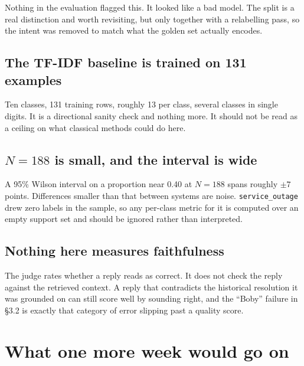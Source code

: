 \documentclass[11pt,a4paper]{article}
\begin{document}
Nothing in the evaluation flagged this. It looked like a bad model. The split is a real
distinction and worth revisiting, but only together with a relabelling pass, so the intent
was removed to match what the golden set actually encodes.

\subsection{The TF-IDF baseline is trained on 131 examples}

Ten classes, 131 training rows, roughly 13 per class, several classes in single digits.
It is a directional sanity check and nothing more. It should not be read as a ceiling on
what classical methods could do here.

\subsection{$N=188$ is small, and the interval is wide}

A 95\% Wilson interval on a proportion near 0.40 at $N=188$ spans roughly $\pm 7$ points.
Differences smaller than that between systems are noise. \texttt{service\_outage} drew
zero labels in the sample, so any per-class metric for it is computed over an empty
support set and should be ignored rather than interpreted.

\subsection{Nothing here measures faithfulness}

The judge rates whether a reply reads as correct. It does not check the reply against the
retrieved context. A reply that contradicts the historical resolution it was grounded on
can still score well by sounding right, and the ``Boby'' failure in \S3.2 is exactly that
category of error slipping past a quality score.

\section{What one more week would go on}
\end{document}
